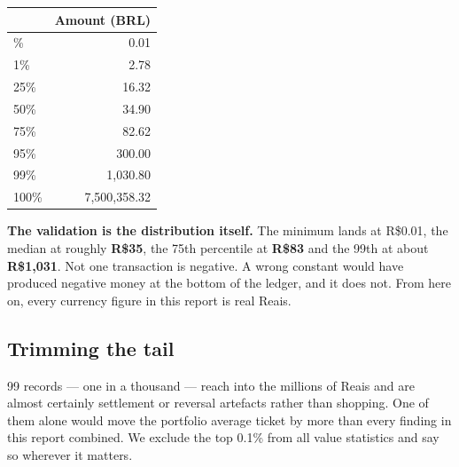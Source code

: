 \documentclass[
]{article}
\newenvironment{Shaded}{\begin{snugshade}}{\end{snugshade}}
\newcommand{\AttributeTok}[1]{\textcolor[rgb]{0.13,0.29,0.53}{#1}}
\newcommand{\DecValTok}[1]{\textcolor[rgb]{0.00,0.00,0.81}{#1}}
\newcommand{\FunctionTok}[1]{\textcolor[rgb]{0.13,0.29,0.53}{\textbf{#1}}}
\newcommand{\NormalTok}[1]{#1}
\newcommand{\SpecialCharTok}[1]{\textcolor[rgb]{0.81,0.36,0.00}{\textbf{#1}}}
\newcommand{\StringTok}[1]{\textcolor[rgb]{0.31,0.60,0.02}{#1}}
\newcounter{none} %
\begin{document}
\begin{Shaded}
\end{Shaded}

{\def\LTcaptype{none} %
\begin{longtable}[]{@{}lr@{}}
\toprule\noalign{}
& Amount (BRL) \\
\midrule\noalign{}
\endhead
\bottomrule\noalign{}
\endlastfoot
0\% & 0.01 \\
1\% & 2.78 \\
25\% & 16.32 \\
50\% & 34.90 \\
75\% & 82.62 \\
95\% & 300.00 \\
99\% & 1,030.80 \\
100\% & 7,500,358.32 \\
\end{longtable}
}

\textbf{The validation is the distribution itself.} The minimum lands at
R\$0.01, the median at roughly \textbf{R\$35}, the 75th percentile at
\textbf{R\$83} and the 99th at about \textbf{R\$1,031}. Not one
transaction is negative. A wrong constant would have produced negative
money at the bottom of the ledger, and it does not. From here on, every
currency figure in this report is real Reais.

\subsection{Trimming the tail}\label{trimming-the-tail}

99 records --- one in a thousand --- reach into the millions of Reais
and are almost certainly settlement or reversal artefacts rather than
shopping. One of them alone would move the portfolio average ticket by
more than every finding in this report combined. We exclude the top
0.1\% from all value statistics and say so wherever it matters.
\end{document}
